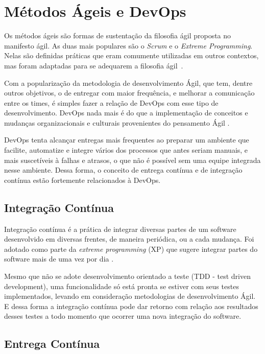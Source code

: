 \section{Métodos Ágeis e DevOps}

Os métodos ágeis são formas de sustentação da filosofia ágil proposta no manifesto
ágil. As duas mais populares são o \textit{Scrum} e o \textit{Extreme Programming}. Nelas
são definidas práticas que eram comumente utilizadas em outros contextos,
mas foram adaptadas para se adequarem a filosofia ágil~\cite{shore:2007}.

Com a popularização da metodologia de desenvolvimento Ágil, que tem, dentre outros
objetivos, o de entregar com maior frequência, e melhorar a comunicação entre os
times, é simples fazer a relação de DevOps com esse tipo de desenvolvimento.
DevOps nada mais é do que a implementação de conceitos e mudanças organizacionais
e culturais provenientes do pensamento Ágil \cite{scott2014}.

DevOps tenta alcançar entregas mais frequentes ao preparar um ambiente que facilite,
automatize e integre vários dos processos que antes seriam manuais, e mais
suscetíveis à falhas e atrasos, o que não é possível sem uma equipe integrada
nesse ambiente. Dessa forma, o conceito de entrega contínua e de integração
contínua estão fortemente relacionados à DevOps.~\cite{adambertram:2016}

\subsection{Integração Contínua}

Integração contínua é a prática de integrar diversas partes de um software
desenvolvido em diversas frentes, de maneira periódica, ou a cada mudança.
Foi adotado como parte da \textit{extreme programming} (XP) que sugere integrar
partes do software mais de uma vez por dia \cite{fowler2006continuous}.

Mesmo que não se adote desenvolvimento orientado a teste (TDD - test driven 
development), uma funcionalidade só está pronta se estiver com seus testes 
implementados, levando em consideração metodologias de desenvolvimento Ágil. 
E dessa forma a integração contínua pode dar retorno com relação aos resultados
desses testes a todo momento que ocorrer uma nova integração do software.

\subsection{Entrega Contínua}

